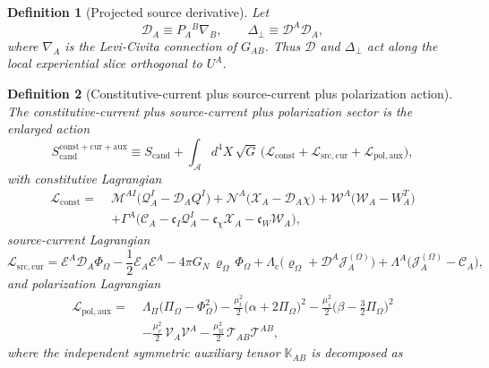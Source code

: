 \documentclass[11pt]{article}
\newcommand{\Sub}{\mathcal{A}}
\newcommand{\ProjSub}{P}
\newcommand{\SpatialD}{\mathcal D}
\newcommand{\LapPerp}{\Delta_\perp}
\newcommand{\FlowPot}{\Phi_\Omega}
\newcommand{\BalanceField}{\Pi_\Omega}
\newcommand{\BalMult}{\Lambda_\Pi}
\newcommand{\SourceDensity}{\varrho_\Omega}
\newcommand{\SourceCurrent}{\mathcal J^{(\Omega)}}
\newcommand{\ConstCurrent}{\mathcal C}
\newcommand{\QCarrier}{\mathcal Q}
\newcommand{\ChiCarrier}{\mathcal X}
\newcommand{\TransCarrier}{\mathcal W}
\newcommand{\ContMult}{\Lambda_{\mathrm c}}
\newcommand{\CurrentMult}{\Lambda}
\newcommand{\ConstGamma}{\Gamma}
\newcommand{\QMult}{\mathscr M}
\newcommand{\ChiMult}{\mathscr N}
\newcommand{\TransMult}{\mathscr W}
\newcommand{\SourceFlux}{\mathcal E}
\newcommand{\AuxPol}{\mathbb K}
\newcommand{\CandAction}{S_{\mathrm{cand}}}
\newcommand{\ConstitutiveAction}{S_{\mathrm{cand}}^{\mathrm{const+cur+aux}}}
\newtheorem{definition}{Definition}
\begin{document}
\begin{definition}[Projected source derivative]
\label{def:projected}
Let
\begin{equation}
\SpatialD_A\equiv \ProjSub_A{}^B\nabla_B,
\qquad
\LapPerp\equiv \SpatialD^A\SpatialD_A,
\label{eq:projderiv}
\end{equation}
where \(\nabla_A\) is the Levi-Civita connection of \(G_{AB}\). Thus \(\SpatialD\) and \(\LapPerp\) act along the local experiential slice orthogonal to \(U^A\).
\end{definition}

\begin{definition}[Constitutive-current plus source-current plus polarization action]
\label{def:action}
The \emph{constitutive-current plus source-current plus polarization sector} is the enlarged action
\begin{equation}
\ConstitutiveAction
\equiv
\CandAction
+
\int_{\Sub} d^4X\,\sqrt{G}\,
\bigl(
\mathcal L_{\mathrm{const}}
+\mathcal L_{\mathrm{src,cur}}
+\mathcal L_{\mathrm{pol,aux}}
\bigr),
\label{eq:fullaction}
\end{equation}
with constitutive Lagrangian
\begin{align}
\mathcal L_{\mathrm{const}}
=\;&
\QMult^{AI}\bigl(\QCarrier^I_A-\SpatialD_AQ^I\bigr)
+\ChiMult^A\bigl(\ChiCarrier_A-\SpatialD_A\chi\bigr)
+\TransMult^A\bigl(\TransCarrier_A-W_A^T\bigr)
\nonumber\\
&+\ConstGamma^A\bigl(
\ConstCurrent_A
-\mathfrak c_I\QCarrier^I_A
-\mathfrak c_\chi\ChiCarrier_A
-\mathfrak c_W\TransCarrier_A
\bigr),
\label{eq:lconst}
\end{align}
source-current Lagrangian
\begin{equation}
\mathcal L_{\mathrm{src,cur}}
=
\SourceFlux^A\SpatialD_A\FlowPot
-\frac12 \SourceFlux_A\SourceFlux^A
-4\pi G_N\,\SourceDensity\,\FlowPot
+\ContMult\bigl(\SourceDensity+\SpatialD^A\SourceCurrent_A\bigr)
+\CurrentMult^A\bigl(\SourceCurrent_A-\ConstCurrent_A\bigr),
\label{eq:lcur}
\end{equation}
and polarization Lagrangian
\begin{align}
\mathcal L_{\mathrm{pol,aux}}
=\;&
\BalMult\bigl(\BalanceField-\FlowPot^2\bigr)
-\frac{\mu_t^2}{2}\bigl(\alpha+2\BalanceField\bigr)^2
-\frac{\mu_s^2}{2}\bigl(\beta-\tfrac32\BalanceField\bigr)^2
\nonumber\\
&-\frac{\mu_v^2}{2}\,\mathcal V_A\mathcal V^A
-\frac{\mu_{\mathrm{tf}}^2}{2}\,\mathcal T_{AB}\mathcal T^{AB},
\label{eq:laux}
\end{align}
where the independent symmetric auxiliary tensor \(\AuxPol_{AB}\) is decomposed as

\end{definition}
\end{document}
